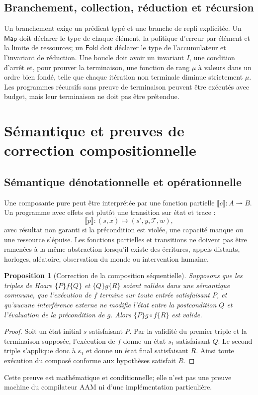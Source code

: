 \documentclass[11pt,a4paper]{article}
\newcommand{\trace}{\mathcal{T}}
\theoremstyle{definition}
\theoremstyle{plain}
\newtheorem{proposition}[definition]{Proposition}
\theoremstyle{remark}
\begin{document}
\subsection{Branchement, collection, réduction et récursion}
Un branchement exige un prédicat typé et une branche de repli explicitée. Un $\mathsf{Map}$ doit déclarer le type de chaque élément, la politique d'erreur par élément et la limite de ressources; un $\mathsf{Fold}$ doit déclarer le type de l'accumulateur et l'invariant de réduction. Une boucle doit avoir un invariant $I$, une condition d'arrêt et, pour prouver la terminaison, une fonction de rang $\mu$ à valeurs dans un ordre bien fondé, telle que chaque itération non terminale diminue strictement $\mu$. Les programmes récursifs sans preuve de terminaison peuvent être exécutés avec budget, mais leur terminaison ne doit pas être prétendue.

\section{Sémantique et preuves de correction compositionnelle}
\subsection{Sémantique dénotationnelle et opérationnelle}
Une composante pure peut être interprétée par une fonction partielle $\llbracket c\rrbracket:A\rightharpoonup B$. Un programme avec effets est plutôt une transition sur état et trace :
\[
\llbracket p\rrbracket: (s,x)\mapsto (s',y,\trace,w),
\]
avec résultat non garanti si la précondition est violée, une capacité manque ou une ressource s'épuise. Les fonctions partielles et transitions ne doivent pas être ramenées à la même abstraction lorsqu'il existe des écritures, appels distants, horloges, aléatoire, observation du monde ou intervention humaine.

\begin{proposition}[Correction de la composition séquentielle]
Supposons que les triples de Hoare $\{P\}f\{Q\}$ et $\{Q\}g\{R\}$ soient valides dans une sémantique commune, que l'exécution de $f$ termine sur toute entrée satisfaisant $P$, et qu'aucune interférence externe ne modifie l'état entre la postcondition $Q$ et l'évaluation de la précondition de $g$. Alors $\{P\}g\circ f\{R\}$ est valide.
\end{proposition}
\begin{proof}
Soit un état initial $s$ satisfaisant $P$. Par la validité du premier triple et la terminaison supposée, l'exécution de $f$ donne un état $s_1$ satisfaisant $Q$. Le second triple s'applique donc à $s_1$ et donne un état final satisfaisant $R$. Ainsi toute exécution du composé conforme aux hypothèses satisfait $R$.
\end{proof}
Cette preuve est mathématique et conditionnelle; elle n'est pas une preuve machine du compilateur AAM ni d'une implémentation particulière.
\end{document}
